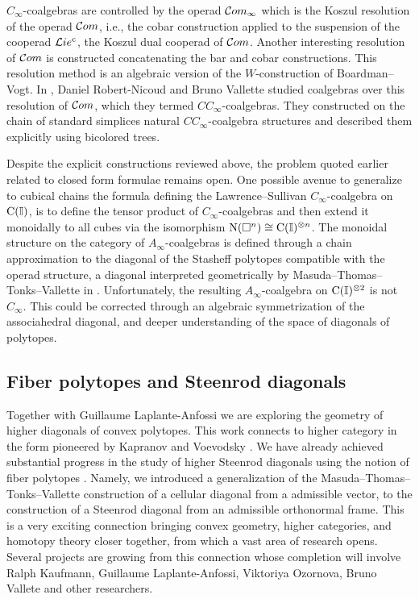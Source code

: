 $C_\infty$-coalgebras are controlled by the operad $\mathcal{C}om_\infty$ which is the Koszul resolution of the operad $\mathcal{C}om$, i.e., the cobar construction applied to the suspension of the cooperad $\mathcal{L}ie^{\mathrm c}$, the Koszul dual cooperad of $\mathcal{C}om$.
Another interesting resolution of $\mathcal{C}om$ is constructed concatenating the bar and cobar constructions.
This resolution method is an algebraic version of the $W$-construction of Boardman--Vogt.
In \cite{vallette2020higherlietheory}, Daniel Robert-Nicoud and Bruno Vallette studied coalgebras over this resolution of $\mathcal{C}om$, which they termed $CC_\infty$-coalgebras.
They constructed on the chain of standard simplices natural $CC_\infty$-coalgebra structures and described them explicitly using bicolored trees.

Despite the explicit constructions reviewed above, the problem quoted earlier related to closed form formulae remains open.
One possible avenue to generalize to cubical chains the formula defining the Lawrence--Sullivan $C_\infty$-coalgebra on $\operatorname{C}(\mathbb{I})$, is to define the tensor product of $C_\infty$-coalgebras and then extend it monoidally to all cubes via the isomorphism $\operatorname{N}(\square^n) \cong \operatorname{C}(\mathbb{I})^{\otimes n}$.
The monoidal structure on the category of $A_\infty$-coalgebras is defined through a chain approximation to the diagonal of the Stasheff polytopes compatible with the operad structure, a diagonal interpreted geometrically by Masuda--Thomas--Tonks--Vallette in \cite{vallette2021associahedra}.
Unfortunately, the resulting $A_\infty$-coalgebra on $\operatorname{C}(\mathbb{I})^{\otimes 2}$ is not $C_\infty$.
This could be corrected through an algebraic symmetrization of the associahedral diagonal, and deeper understanding of the space of diagonals of polytopes.

\subsection{Fiber polytopes and Steenrod diagonals} \label{ss:polytopes}

Together with Guillaume Laplante-Anfossi we are exploring the geometry of higher diagonals of convex polytopes.
This work connects to higher category in the form pioneered by Kapranov and Voevodsky \cite{kapranov1991polycategories}.
We have already achieved substantial progress in the study of higher Steenrod diagonals using the notion of fiber polytopes \cite{billera1992fiber.polytopes}.
Namely, we introduced a generalization of the Masuda--Thomas--Tonks--Vallette construction of a cellular diagonal from a admissible vector, to the construction of a Steenrod diagonal from an admissible orthonormal frame.
This is a very exciting connection bringing convex geometry, higher categories, and homotopy theory closer together, from which a vast area of research opens.
Several projects are growing from this connection whose completion will involve Ralph Kaufmann, Guillaume Laplante-Anfossi, Viktoriya Ozornova, Bruno Vallete and other researchers.

